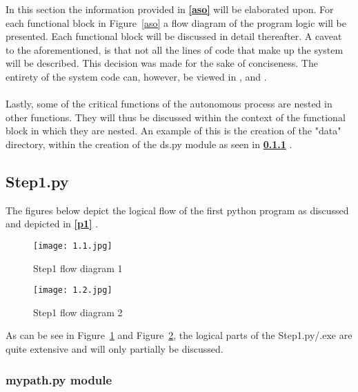 In this section the information provided in \textbf{\ref{aso} } will be elaborated upon. For each functional block in Figure~\ref{aso} a flow diagram of the program logic will be presented. Each functional block will be discussed in detail thereafter. A caveat to the aforementioned, is that not all the lines of code that make up the system will be described. This decision was made for the sake of conciseness. The entirety of the system code can, however, be viewed in \textbf{}, \textbf{} and \textbf{}.
\\\\
Lastly, some of the critical functions of the autonomous process are nested in other functions. They will thus be discussed within the context of the functional block in which they are nested. An example of this is the creation of the "data" directory, within the creation of the ds.py module as seen in \textbf{\ref{mypath} }.

\newpage\cleardoublepage

\subsection{Step1.py}
\label{step1}

The figures below depict the logical flow of the first python program as discussed and depicted in \textbf{\ref{p1} }. 
\begin{figure}[H]
\begin{center}
\texttt{[image: 1.1.jpg]}
\caption{Step1 flow diagram 1}
\label{1.1}
\end{center}
\end{figure}

\begin{figure}[H]
\begin{center}
\texttt{[image: 1.2.jpg]}
\caption{Step1 flow diagram 2}
\label{1.2}
\end{center}
\end{figure}

As can be see in Figure~\ref{1.1} and Figure~\ref{1.2}, the logical parts of the Step1.py/.exe are quite extensive and will only partially be discussed. 

\subsubsection{mypath.py module}
\label{mypath}

